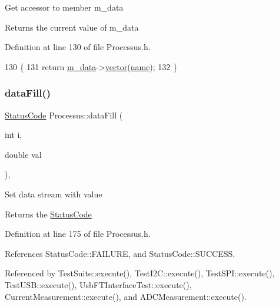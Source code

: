 Get accessor to member m\+\_\+data \begin{DoxyReturn}{Returns}
the current value of m\+\_\+data 
\end{DoxyReturn}


Definition at line 130 of file Processus.\+h.


\begin{DoxyCode}
130                                         \{
131     \textcolor{keywordflow}{return} \hyperlink{classProcessus_a3da9a9de8af54e2f47807a3e09dfccff}{m\_data}->\hyperlink{classData_a94e00cdd58c1d6f11487f1ac47fee4bc}{vector}(\hyperlink{classObject_a300f4c05dd468c7bb8b3c968868443c1}{name});
132   \}
\end{DoxyCode}
\mbox{\label{classProcessus_a0d093b48f3218a088ba030e24372f18c}} 
\subsubsection{\texorpdfstring{data\+Fill()}{dataFill()}\hspace{0.1cm}{\footnotesize\ttfamily [1/2]}}
{\footnotesize\ttfamily \hyperlink{classStatusCode}{Status\+Code} Processus\+::data\+Fill (\begin{DoxyParamCaption}\item[{int}]{i,  }\item[{double}]{val }\end{DoxyParamCaption})\hspace{0.3cm}{\ttfamily [inline]}, {\ttfamily [inherited]}}

Set data stream with value \begin{DoxyReturn}{Returns}
the \hyperlink{classStatusCode}{Status\+Code} 
\end{DoxyReturn}


Definition at line 175 of file Processus.\+h.



References Status\+Code\+::\+F\+A\+I\+L\+U\+RE, and Status\+Code\+::\+S\+U\+C\+C\+E\+SS.



Referenced by Test\+Suite\+::execute(), Test\+I2\+C\+::execute(), Test\+S\+P\+I\+::execute(), Test\+U\+S\+B\+::execute(), Usb\+F\+T\+Interface\+Test\+::execute(), Current\+Measurement\+::execute(), and A\+D\+C\+Measurement\+::execute().


